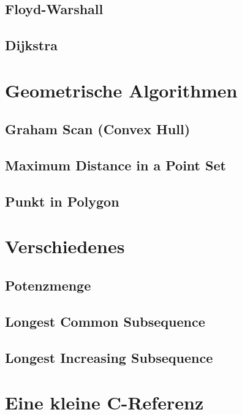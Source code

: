 \documentclass[10pt,a4paper,ngerman]{article}
\begin{document}
\subsection{Floyd-Warshall}

\subsection{Dijkstra}


\section{Geometrische Algorithmen}
\subsection{Graham Scan (Convex Hull)}

\subsection{Maximum Distance in a Point Set}

\subsection{Punkt in Polygon}

\section{Verschiedenes}
\subsection{Potenzmenge}

\subsection{Longest Common Subsequence}

\subsection{Longest Increasing Subsequence}

\section{Eine kleine C-Referenz}




\end{document}
